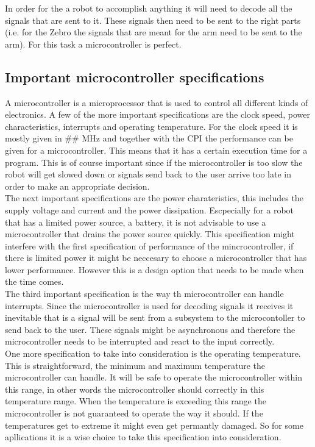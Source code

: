 \documentclass{article}
\begin{document}
In order for the a robot to accomplish anything it will need to decode all the signals that are sent to it. These signals then need to be sent to the right parts (i.e. for the Zebro the signals that are meant for the arm need to be sent to the arm). For this task a microcontroller is perfect.

\subsection{Important microcontroller specifications}

A microcontroller is a microprocessor that is used to control all different kinds of electronics. A few of the more important specifications are the clock speed, power characteristics, interrupts and operating temperature. For the clock speed it is mostly given in \#\# MHz and together with the CPI the performance can be given for a microcontroller. This means that it has a certain execution time for a program. This is of course important since if the microcontroller is too slow the robot will get slowed down or signals send back to the user arrive too late in order to make an appropriate decision. \\
The next important specifications are the power charateristics, this includes the supply voltage and current and the power dissipation. Escpecially for a robot that has a limited power source, a battery, it is not advisable to use a microcontroller that drains the power source quickly. This specification might interfere with the first specification of performance of the mincrocontroller, if there is limited power it might be neccesary to choose a microcontroller that has lower performance. However this is a design option that needs to be made when the time comes.\\
The third important specification is the way th microcontroller can handle interrupts. Since the microcontroller is used for decoding signals it receives it inevitable that is a signal will be sent from a subsystem to the microcontoller to send back to the user. These signals might  be asynchronous and therefore the microcontroller needs to be interrupted and react to the input correctly.\\
One more specification to take into consideration is the operating temperature. This is straightforward, the minimum and maximum temperature the microcontroller can handle. It will be safe to operate the microcontroller within this range, in other words the microcontroller should correctly in this temperature range. When the temperature is exceeding this range the microcontroller is not guaranteed to operate the way it should. If the temperatures get to extreme it might even get permantly damaged. So for some apllications it is a wise choice to take this specification into consideration.\\
\end{document}
